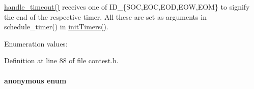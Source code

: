 \hyperlink{classContest_Contesta5}{handle\_\-timeout()} receives one of ID\_\-\{SOC,EOC,EOD,EOW,EOM\} to signify the end of the respective timer. All these are set as arguments in schedule\_\-timer() in \hyperlink{classContest_Contesta7}{init\-Timers()}. \begin{Desc}
\item[Enumeration values: ]\par
\begin{description}
\item[{\em 
\hypertarget{classContest_Contests12Contests1}{
{\em ID\_\-SOC}}
\label{classContest_Contests12Contests1}
}]\item[{\em 
\hypertarget{classContest_Contests12Contests2}{
{\em ID\_\-EOD}}
\label{classContest_Contests12Contests2}
}]\item[{\em 
\hypertarget{classContest_Contests12Contests3}{
{\em ID\_\-EOW}}
\label{classContest_Contests12Contests3}
}]\item[{\em 
\hypertarget{classContest_Contests12Contests4}{
{\em ID\_\-EOM}}
\label{classContest_Contests12Contests4}
}]\item[{\em 
\hypertarget{classContest_Contests12Contests5}{
{\em ID\_\-EOC}}
\label{classContest_Contests12Contests5}
}]\end{description}
\end{Desc}



Definition at line 88 of file contest.h.\hypertarget{classContest_Contests13}{
\paragraph["@3]{\setlength{\rightskip}{0pt plus 5cm}anonymous enum}\hfill}
\label{classContest_Contests13}


